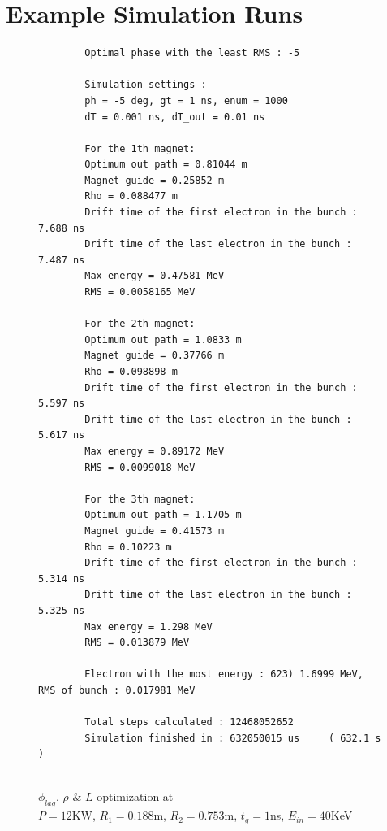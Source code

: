 \documentclass[a4paper,oneside,12pt]{report}
\numberwithin{equation}{chapter}
\begin{document}
\chapter{Example Simulation Runs} \label{appendix:example_simulation_runs}

\begin{figure}[H]
    \centering
    \captionsetup{justification=centering}
    \begin{verbatim}
        Optimal phase with the least RMS : -5

        Simulation settings : 
        ph = -5 deg, gt = 1 ns, enum = 1000
        dT = 0.001 ns, dT_out = 0.01 ns
        
        For the 1th magnet:
        Optimum out path = 0.81044 m
        Magnet guide = 0.25852 m
        Rho = 0.088477 m
        Drift time of the first electron in the bunch : 7.688 ns
        Drift time of the last electron in the bunch : 7.487 ns
        Max energy = 0.47581 MeV
        RMS = 0.0058165 MeV
        
        For the 2th magnet:
        Optimum out path = 1.0833 m
        Magnet guide = 0.37766 m
        Rho = 0.098898 m
        Drift time of the first electron in the bunch : 5.597 ns
        Drift time of the last electron in the bunch : 5.617 ns
        Max energy = 0.89172 MeV
        RMS = 0.0099018 MeV
        
        For the 3th magnet:
        Optimum out path = 1.1705 m
        Magnet guide = 0.41573 m
        Rho = 0.10223 m
        Drift time of the first electron in the bunch : 5.314 ns
        Drift time of the last electron in the bunch : 5.325 ns
        Max energy = 1.298 MeV
        RMS = 0.013879 MeV

        Electron with the most energy : 623) 1.6999 MeV,	RMS of bunch : 0.017981 MeV
        
        Total steps calculated : 12468052652
        Simulation finished in : 632050015 us     ( 632.1 s )
        
    \end{verbatim}
\caption{$\phi_{lag}$, $\rho$ \& $L$ optimization at \\$P=12$KW, $R_1=0.188$m, $R_2=0.753$m, $t_g=1$ns, $E_{in}=40$KeV}
\label{fig:lout_opt_1ns_Erms}
\end{figure}
\end{document}
